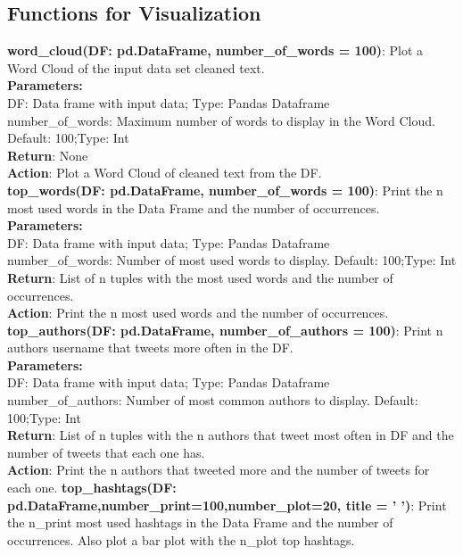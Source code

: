 \subsection{Functions for Visualization}
\textbf{word\_cloud(DF: pd.DataFrame, number\_of\_words = 100)}: Plot a Word Cloud of the input data set cleaned text.\\
\textbf{Parameters:}\\
DF: Data frame with input data; Type: Pandas Dataframe\\
number\_of\_words: Maximum number of words to display in the Word Cloud. Default: 100;Type: Int\\
\textbf{Return}: None\\
\textbf{Action}: Plot a Word Cloud of cleaned text from the DF.\\
\newline
\newline
\noindent\textbf{top\_words(DF: pd.DataFrame, number\_of\_words = 100)}: Print the n most used words  in the Data Frame and the number of occurrences.\\
\textbf{Parameters:}\\
DF: Data frame with input data; Type: Pandas Dataframe\\
number\_of\_words: Number of most used words to display. Default: 100;Type: Int\\
\textbf{Return}: List of n tuples with the most used words and the number of occurrences.\\
\textbf{Action}: Print the n most used words and the number of occurrences.
\newline
\newline
\noindent\textbf{top\_authors(DF: pd.DataFrame, number\_of\_authors = 100)}: Print n authors username that tweets more often in the DF.\\
\textbf{Parameters:}\\
DF: Data frame with input data; Type: Pandas Dataframe\\
number\_of\_authors: Number of most common authors to display. Default: 100;Type: Int\\
\textbf{Return}: List of n tuples with the n authors that tweet most often in DF and the number of tweets that each one has.\\
\textbf{Action}: Print the n authors that tweeted more and the number of tweets for each one.
\newline
\newline
\noindent\textbf{top\_hashtags(DF: pd.DataFrame,number\_print=100,number\_plot=20, title = ' ')}: Print the n\_print most used hashtags in the Data Frame and the number of occurrences. Also plot a bar plot with the n\_plot top hashtags.\\
